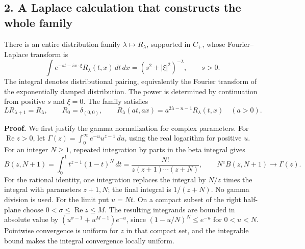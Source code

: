 \documentclass[
  11pt,
]{article}
\begin{document}
\subsection{2. A Laplace calculation that constructs the whole
family}\label{a-laplace-calculation-that-constructs-the-whole-family}

There is an entire distribution family \(\lambda\mapsto R_\lambda\),
supported in \(C_+\), whose Fourier--Laplace transform is \[
 \int e^{-st-ix\cdot\xi}R_\lambda(t,x)\,dt\,dx
       =(s^2+|\xi|^2)^{-\lambda},\qquad s>0.
 \tag{W4}
\] The integral denotes distributional pairing, equivalently the Fourier
transform of the exponentially damped distribution. The power is
determined by continuation from positive \(s\) and \(\xi=0\). The family
satisfies \[
 LR_{\lambda+1}=R_\lambda,\qquad R_0=\delta_{(0,0)},\qquad
 R_\lambda(at,ax)=a^{2\lambda-n-1}R_\lambda(t,x)\quad(a>0).
 \tag{W5}
\]

\textbf{Proof.} We first justify the gamma normalization for complex
parameters. For \(\operatorname{Re}z>0\), let
\(\Gamma(z)=\int_0^\infty e^{-u}u^{z-1}\,du\), using the real logarithm
for positive \(u\). For an integer \(N\geq1\), repeated integration by
parts in the beta integral gives \[
 B(z,N+1)=\int_0^1 t^{z-1}(1-t)^N\,dt
 =\frac{N!}{z(z+1)\cdots(z+N)},\qquad
 N^zB(z,N+1)\longrightarrow\Gamma(z).
 \tag{W4a}
\] For the rational identity, one integration replaces the integral by
\(N/z\) times the integral with parameters \(z+1,N\); the final integral
is \(1/(z+N)\). No gamma division is used. For the limit put \(u=Nt\).
On a compact subset of the right half-plane choose
\(0<\sigma\leq\operatorname{Re}z\leq M\). The resulting integrands are
bounded in absolute value by \((u^{\sigma-1}+u^{M-1})e^{-u}\), since
\((1-u/N)^N\leq e^{-u}\) for \(0<u<N\). Pointwise convergence is uniform
for \(z\) in that compact set, and the integrable bound makes the
integral convergence locally uniform.
\end{document}
